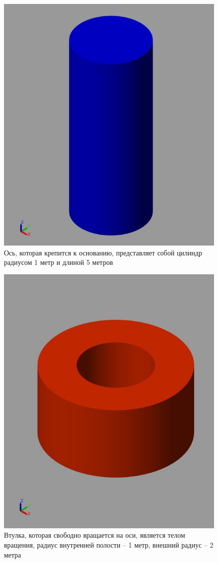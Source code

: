 \documentclass{article}
\begin{document}
	\begin{figure}[H]
		\centering
		\includegraphics[width=0.7\linewidth]{cylinder}
		\caption{Ось, которая крепится к основанию, представляет собой цилиндр радиусом 1 метр и длиной 5 метров}
		\label{fig:cylinder}
	\end{figure}
	\begin{figure}[H]
		\centering
		\includegraphics[width=0.7\linewidth]{vtulka}
		\caption{Втулка, которая свободно вращается на оси, является телом вращения, радиус внутренней полости -- 1 метр, внешний радиус -- 2 метра}
		\label{fig:vtulka}
	\end{figure}
\end{document}
